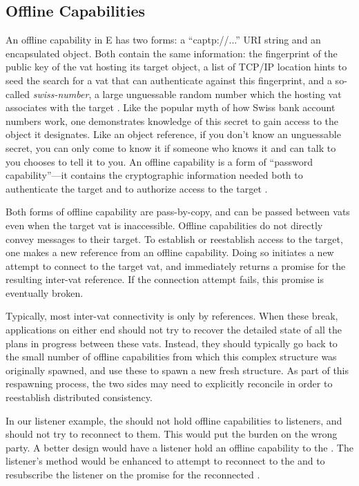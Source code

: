 \documentclass{llncs}
\begin{document}
\subsection{Offline Capabilities}

An offline capability in E has two forms: a ``captp://...'' URI string
and an encapsulated  object. Both contain the same
information: the fingerprint of the public key of the vat hosting its
target object, a list of TCP/IP location hints to seed the search for
a vat that can authenticate against this fingerprint, and a so-called
\emph{swiss-number}, a large unguessable random number which the
hosting vat associates with the target \cite{tyler:yurl}. Like the
popular myth of how Swiss bank account numbers work, one demonstrates
knowledge of this secret to gain access to the object it designates.
Like an object reference, if you don't know an unguessable secret, you
can only come to know it if someone who knows it and can talk to you
chooses to tell it to you. An offline capability is a form of
``password capability''---it contains the cryptographic information
needed both to authenticate the target and to authorize access to the
target \cite{jed:dccs}.

Both forms of offline capability are pass-by-copy, and can be passed
between vats even when the target vat is inaccessible. Offline
capabilities do not directly convey messages to their target. To
establish or reestablish access to the target, one makes a new
reference from an offline capability. Doing so initiates a new attempt
to connect to the target vat, and immediately returns a promise for
the resulting inter-vat reference. If the connection attempt fails,
this promise is eventually broken.

Typically, most inter-vat connectivity is only by references. When
these break, applications on either end should not try to recover the
detailed state of all the plans in progress between these
vats. Instead, they should typically go back to the small number of
offline capabilities from which this complex structure was originally
spawned, and use these to spawn a new fresh structure. As part of this
respawning process, the two sides may need to explicitly reconcile in
order to reestablish distributed consistency.

In our listener example, the  should not hold
offline capabilities to listeners, and should not try to reconnect to
them. This would put the burden on the wrong party. A better design
would have a listener hold an offline capability to the
. The listener's 
method would be enhanced to attempt to reconnect to the
 and to resubscribe the listener on the promise for
the reconnected .
\end{document}
